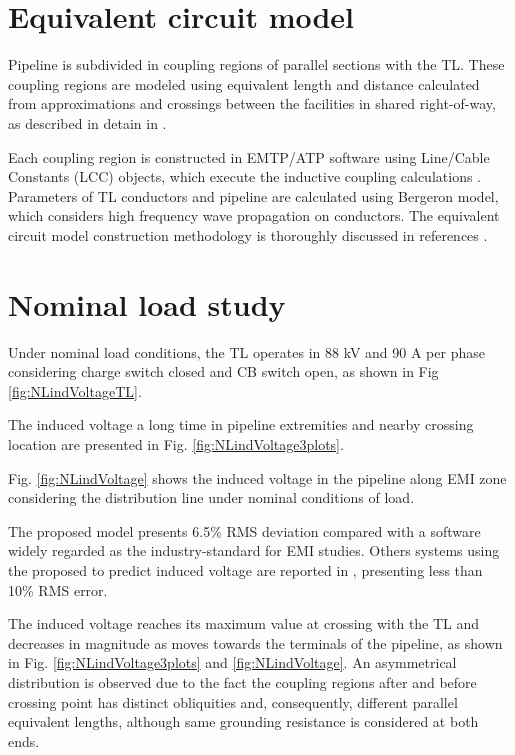 \documentclass[5p,twocolumn]{elsarticle}
\begin{document}
\section{Equivalent circuit model}

Pipeline is subdivided in coupling regions of parallel sections with the TL. These coupling regions are modeled using equivalent length and distance calculated from approximations and crossings between the facilities in shared right-of-way, as described in detain in \cite{Moraes2020}.

Each coupling region is constructed in EMTP/ATP software using Line/Cable Constants (LCC) objects, which execute the inductive coupling calculations \cite{Martins-Britto2020}. Parameters of TL conductors and pipeline are calculated using Bergeron model, which considers high frequency wave propagation on conductors. The equivalent circuit model construction methodology is thoroughly discussed in references \cite{Martins-Britto2020,Moraes2020,Martins-Britto2021}.



\section{Nominal load study}

Under nominal load conditions, the TL operates in 88 kV and 90 A per phase considering charge switch closed and CB switch open, as shown in Fig \ref{fig:NLindVoltageTL}.

The induced voltage a long time in pipeline extremities and nearby crossing location are presented in Fig. \ref{fig:NLindVoltage3plots}. 

Fig. \ref{fig:NLindVoltage} shows the induced voltage in the pipeline along EMI zone considering the distribution line under nominal conditions of load. 

The proposed model presents 6.5\% RMS deviation compared with a software widely regarded as the industry-standard for EMI studies. Others systems using the proposed to predict induced voltage are reported in \cite{Moraes2020,Martins-Britto2021}, presenting less than 10\% RMS error.

The induced voltage reaches its maximum value at crossing with the TL and decreases in magnitude as moves towards the terminals of the pipeline, as shown in Fig. \ref{fig:NLindVoltage3plots} and \ref{fig:NLindVoltage}. An asymmetrical distribution is observed due to the fact the coupling regions after and before crossing point has distinct obliquities and, consequently, different parallel equivalent lengths, although same grounding resistance is considered at both ends. 
\end{document}
